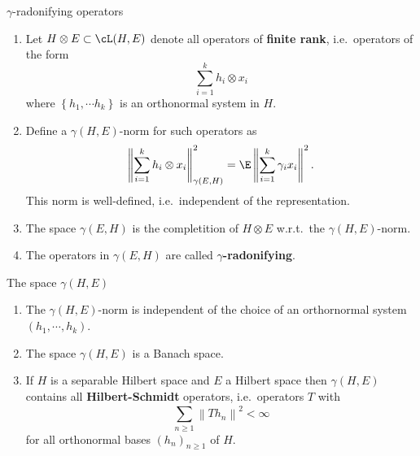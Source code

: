 \begin{frame}
    {$\gamma$-radonifying operators}
    
    \begin{enumerate}
        \item Let $H \otimes E \subset \cL(H,E)$ denote all operators of
            \textbf{finite rank}, i.e.\ operators of the form 
            \begin{equation*}
                \sum_{i=1}^{k} h_i \otimes x_i 
            \end{equation*}
            where $\left\{h_1, \cdots h_k \right\}$ is an orthonormal system in $H$. 
        \item Define a $\gamma(H,E)$-norm for such operators as
            \begin{equation*}
                \left\|  \sum_{i=1}^{k} h_i \otimes x_i  \right\|_{\gamma(E,H)}^2 =
                \E \left\| \sum_{i=1}^{k} \gamma_i x_i \right\|^{2}.
            \end{equation*}
            This norm is well-defined, i.e.\ independent of the representation. 
        \item The space $\gamma(E,H)$ is the completition of $H \otimes E$ 
            w.r.t.\ the $\gamma(H,E)$-norm.
        \item The operators in $\gamma(E,H)$ are called \textbf{$\gamma$-radonifying}.
    \end{enumerate}
\end{frame}


\begin{frame}
    {The space $\gamma(H,E)$}
    
    \begin{enumerate}
        \item The $\gamma(H,E)$-norm is independent of the choice of an orthornormal system 
            $\left( h_1, \cdots, h_k \right)$.
        \item The space $\gamma(H,E)$ is a Banach space.
        \item If $H$ is a separable Hilbert space and $E$ a Hilbert space then
            $\gamma(H,E)$ contains all \textbf{Hilbert-Schmidt} operators, i.e.\
            operators $T$ with 
            \begin{equation*}
                \sum_{n \geq 1}^{} \left\| Th_n \right\|^2 < \infty
            \end{equation*}
            for all orthonormal bases $\left( h_n \right)_{n \geq 1}$ of $H$.
    \end{enumerate}
\end{frame}


